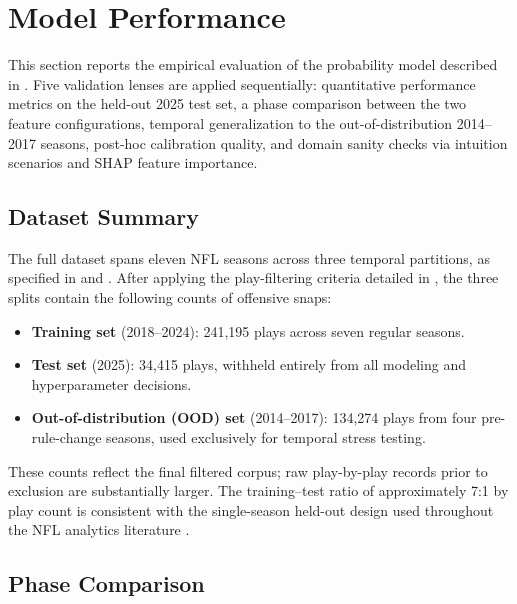 \section{\xscore{} Model Performance}
\label{sec:model-performance}

This section reports the empirical evaluation of the \xscore{} probability
model described in . Five validation lenses are applied
sequentially: quantitative performance metrics on the held-out 2025 test
set, a phase comparison between the two feature configurations, temporal
generalization to the out-of-distribution 2014--2017 seasons, post-hoc
calibration quality, and domain sanity checks via intuition scenarios and
SHAP feature importance.

\subsection{Dataset Summary}
\label{sec:dataset-summary}

The full dataset spans eleven NFL seasons across three temporal partitions,
as specified in  and . After applying the
play-filtering criteria detailed in , the three
splits contain the following counts of offensive snaps:

\begin{itemize}
  \item \textbf{Training set} (2018--2024): 241,195 plays across seven
        regular seasons.
  \item \textbf{Test set} (2025): 34,415 plays, withheld entirely from all
        modeling and hyperparameter decisions.
  \item \textbf{Out-of-distribution (OOD) set} (2014--2017): 134,274 plays
        from four pre-rule-change seasons, used exclusively for temporal
        stress testing.
\end{itemize}

These counts reflect the final filtered corpus; raw play-by-play records
prior to exclusion are substantially larger. The training--test ratio of
approximately 7:1 by play count is consistent with the single-season
held-out design used throughout the NFL analytics literature
\parencite{yurko2019nflwar}.

\subsection{Phase Comparison}
\label{sec:phase-results}

